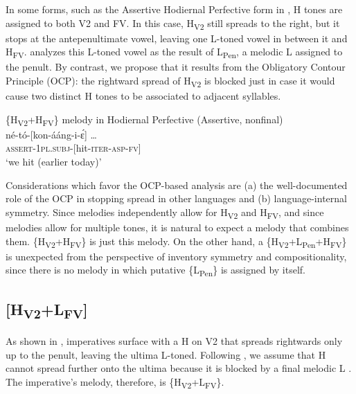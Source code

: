 \documentclass[output=paper,newtxmath,modfonts,nonflat,draft]{langsci/langscibook}
\begin{document}
In some forms, such as the Assertive Hodiernal Perfective form in , H tones are assigned to both V2 and FV. In this case, H\textsubscript{V2} still spreads to the right, but it stops at the antepenultimate vowel, leaving one L-toned vowel in between it and H\textsubscript{FV}. \citet{Roberts-Kohno2014} analyzes this L-toned vowel as the result of L\textsubscript{Pen}, a melodic L  assigned to the penult. By contrast, we propose that it results from the Obligatory Contour Principle (OCP):   the rightward spread of H\textsubscript{V2} is blocked just in case it would cause two distinct H tones to be associated to adjacent syllables.

\ea\label{ex:jones:5}
{\{H\textsubscript{V2}+H\textsubscript{FV}\} melody in Hodiernal Perfective (Assertive, nonfinal)}\\
\gll né-tó-[kon-ááng-i-\'ɛ] …\\
     \textsc{assert-1pl.subj-[}hit-\textsc{iter-asp-fv]}\\
\glt ‘we hit (earlier today)’
\z

Considerations which favor the OCP-based analysis are 
(a) the well-doc\-u\-ment\-ed role of the OCP in stopping  spread in other  languages \citep[e.g.][]{Myers1997,Odden2014} and 
(b) language-internal symmetry. Since  melodies independently allow for H\textsubscript{V2} and H\textsubscript{FV}, and since  melodies allow for multiple tones, it is natural to expect a melody that combines them. \{H\textsubscript{V2}+H\textsubscript{FV}\} is just this melody. On the other hand, a \{H\textsubscript{V2}+L\textsubscript{Pen}+H\textsubscript{FV}\} is unexpected from the perspective of inventory symmetry and compositionality, since there is no melody in which putative \{L\textsubscript{Pen}\} is assigned by itself.


\subsection{[H\textsubscript{V2}+L\textsubscript{FV}]}\label{sec:jones:3.5}


As shown in ,  imperatives surface with a H  on V2 that spreads rightwards only up to the penult, leaving the ultima L-toned. Following \citet{Roberts-Kohno2014}, we assume that H cannot spread further onto the ultima because it is blocked by a final melodic L . The imperative’s melody, therefore, is \{H\textsubscript{V2}+L\textsubscript{FV}\}.
\end{document}
